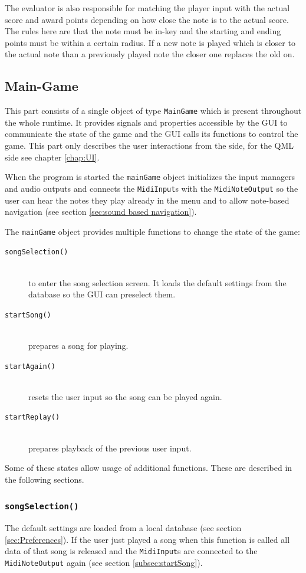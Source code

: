 The evaluator is also responsible for matching the player input with the actual score and award points depending on how close the note is to the actual score. The rules here are that the note must be in-key and the starting and ending points must be within a certain radius. If a new note is played which is closer to the actual note than a previously played note the closer one replaces the old on. 

\subsection{Main-Game}
This part consists of a single object of type {\tt MainGame} which is present throughout the whole runtime. It provides signals and properties accessible by the GUI to communicate the state of the game and the GUI calls its functions to control the game. This part only describes the user interactions from the \cpp side, for the QML side see chapter \ref{chap:UI}.

When the program is started the {\tt mainGame} object initializes the input managers and audio outputs and connects the {\tt MidiInput}s with the {\tt MidiNoteOutput} so the user can hear the notes they play already in the menu and to allow note-based navigation (see section \ref{sec:sound based navigation}).

The {\tt mainGame} object provides multiple functions to change the state of the game:
\begin{description}
	\item[{\tt songSelection()}] \hfil \\ to enter the song selection screen. It loads the default settings from the database so the GUI can preselect them.
	\item[{\tt startSong()}] \hfil \\ prepares a song for playing.
	\item[{\tt startAgain()}] \hfil \\ resets the user input so the song can be played again.
	\item[{\tt startReplay()}] \hfil \\ prepares playback of the previous user input.
\end{description}

Some of these states allow usage of additional functions. These are described in the following sections.

\subsubsection{{\tt songSelection()}}
The default settings are loaded from a local database (see section \ref{sec:Preferences}). If the user just played a song when this function is called all data of that song is released and the {\tt MidiInput}s are connected to the {\tt MidiNoteOutput} again (see section \ref{subsec:startSong}).

